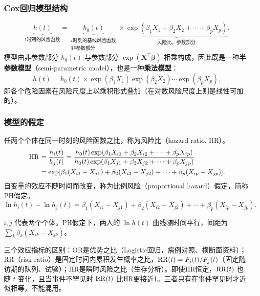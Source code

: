 \subsubsection{Cox回归模型结构}
\[
\underbrace{h(t)}_{t\text{时刻的风险函数}}=
\underbrace{h_0(t)}_{\substack{t\text{时刻的基线风险函数}\\\text{非参数部分}}}
\times\underbrace{\exp(\beta_1X_1+\beta_2X_2+\cdots+\beta_pX_p)}_{\text{风险比，参数部分}}.
\]
模型由非参数部分 $h_0(t)$ 与参数部分 $\exp(\bm X^\top\bm\beta)$ 相乘构成，因此既是一种\textbf{半参数模型}（semi-parametric model），也是一种\textbf{乘法模型}：
\[
h(t)=h_0(t)\times\exp(\beta_1X_1)\exp(\beta_2X_2)\cdots\exp(\beta_pX_p),
\]
即各个危险因素在风险尺度上以乘积形式叠加（在对数风险尺度上则是线性可加的）。
\subsubsection{模型的假定}
任两个个体在同一时刻的风险函数之比，称为风险比（hazard ratio, HR）。
\begin{align*}
\operatorname{HR}&=\frac{h_i(t)}{h_j(t)}
=\frac{h_0(t)\exp(\beta_1X_{i1}+\beta_2X_{i2}+\cdots+\beta_pX_{ip})}
 {h_0(t)\exp(\beta_1X_{j1}+\beta_2X_{j2}+\cdots+\beta_pX_{jp})}\\
&=\exp[\beta_1(X_{i1}-X_{j1})+\beta_2(X_{i2}-X_{j2})+\cdots+\beta_p(X_{ip}-X_{jp})].
\end{align*}
自变量的效应不随时间而改变，称为比例风险（proportional hazard）假定，简称PH假定。
\[
\ln h_i(t)-\ln h_j(t)=\beta_1(X_{i1}-X_{j1})+\beta_2(X_{i2}-X_{j2})+\cdots+\beta_p(X_{ip}-X_{jp}).
\]
\begin{annotation}$i,j$ 代表两个个体。PH假定下，两人的 $\ln h(t)$ 曲线随时间平行，间距为 $\sum_k\beta_k(X_{ik}-X_{jk})$。

三个效应指标的区别：OR是优势之比（Logistic回归，病例对照、横断面资料）；RR（risk ratio）是固定时间内累积发生概率之比，$\operatorname{RR}(t)=F_i(t)/F_j(t)$（固定随访期的队列、试验）；HR是瞬时风险之比（生存分析）。即使HR恒定，$\operatorname{RR}(t)$ 也随 $t$ 变化，且当事件不罕见时 $\operatorname{RR}(t)$ 比HR更接近1。三者只有在事件罕见时才近似相等，不能混用。\end{annotation}
